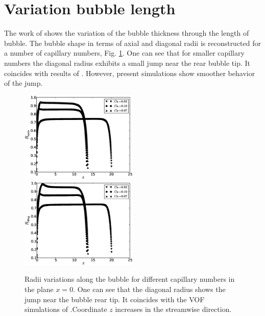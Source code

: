 \documentclass{article}
\begin{document}
\section{Variation bubble length}
The work of \citet{wang-non-circular} shows the variation of the bubble
thickness through the length of
bubble. The bubble shape in terms of axial and diagonal radii is reconstructed for a number of
capillary numbers, Fig. \ref{fig:bubble:variation:capillaries}. One can see that for smaller
capillary numbers the diagonal radius exhibits a small jump near the rear bubble tip. It coincides
with results of \citet{wang-non-circular}. However, present simulations show smoother behavior of
the jump.  
\begin{figure}[ht]
\includegraphics[width=0.5\textwidth]{Figures/bubble_rad_axis.eps}
\includegraphics[width=0.5\textwidth]{Figures/bubble_rad_diag.eps}\\
\caption{Radii variations along the bubble for different capillary numbers in the plane $x=0$.
One can see that the diagonal radius shows the jump near the bubble rear tip. It coincides with the
VOF simulations of \citet{wang-non-circular}.Coordinate $z$ increases in the streamwise direction.
\label{fig:bubble:variation:capillaries}}
\end{figure}
\end{document}
